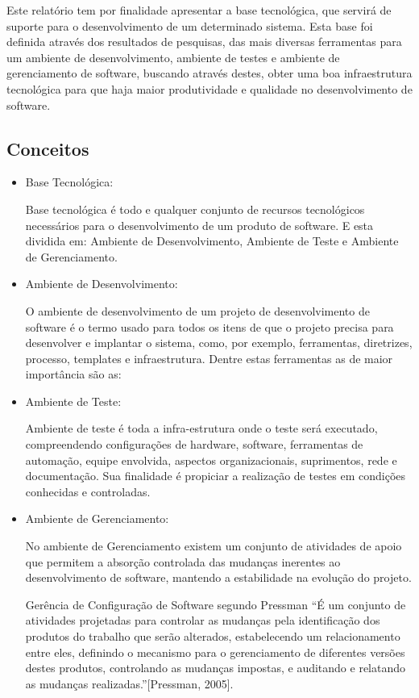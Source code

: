 \documentclass[12pt,a4paper]{article}
\begin{document}
	Este relatório tem por finalidade apresentar a base tecnológica, que servirá de suporte para o desenvolvimento de um determinado sistema. 
	Esta base foi definida através dos resultados de pesquisas, das mais diversas ferramentas para um ambiente de desenvolvimento, 
	ambiente de testes e ambiente de gerenciamento de software, buscando através destes, 
	obter uma boa infraestrutura tecnológica para que haja maior produtividade e qualidade no desenvolvimento de software.

	\subsection{Conceitos}
	
	\begin{itemize}
	\item Base Tecnológica: 
	
	Base tecnológica é todo e qualquer conjunto de recursos tecnológicos necessários para o desenvolvimento de um produto de software. E esta dividida em: Ambiente de Desenvolvimento, Ambiente de Teste e Ambiente de Gerenciamento.
	\item Ambiente de Desenvolvimento:
	
	 O ambiente de desenvolvimento de um projeto de desenvolvimento de software é o termo usado para todos os itens de que o projeto precisa para desenvolver e implantar o sistema, como, por exemplo, ferramentas, diretrizes, processo, templates e infraestrutura. Dentre estas ferramentas as de maior importância são as:
	\item Ambiente de Teste: 
	
	Ambiente de teste é toda a infra-estrutura onde o teste será executado, compreendendo configurações de hardware, software, ferramentas de automação, equipe envolvida, aspectos organizacionais, suprimentos, rede e documentação. Sua finalidade é propiciar a realização de testes em condições conhecidas e controladas.
	\item Ambiente de Gerenciamento:
	
	 No ambiente de Gerenciamento existem um conjunto de atividades de apoio que permitem a absorção controlada das mudanças inerentes ao desenvolvimento de software, mantendo a estabilidade na evolução do projeto.
	
	Gerência de Configuração de Software segundo Pressman “É um conjunto de atividades projetadas para controlar as mudanças pela identificação dos produtos do trabalho que serão alterados, estabelecendo um relacionamento entre eles, definindo o mecanismo para o gerenciamento de diferentes versões destes produtos, controlando as mudanças impostas, e auditando e relatando as mudanças realizadas.”[Pressman, 2005].
	\end{itemize}
	
\end{document}
